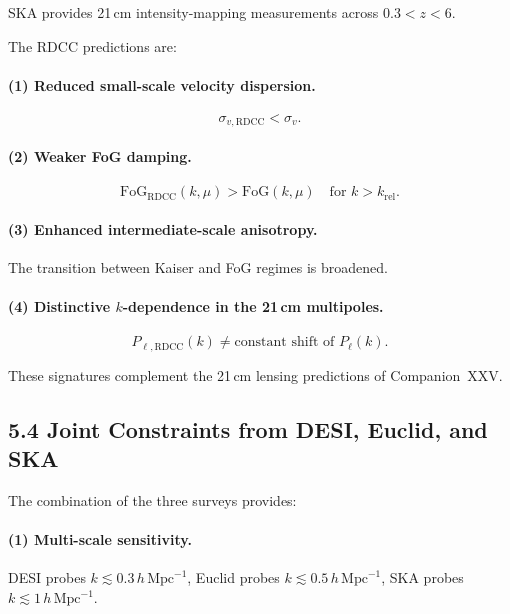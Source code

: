 \documentclass[11pt,a4paper]{article}
\begin{document}
SKA provides 21\,cm intensity-mapping measurements across $0.3 < z < 6$.

The RDCC predictions are:

\paragraph{(1) Reduced small-scale velocity dispersion.}


\[
\sigma_{v,\mathrm{RDCC}} < \sigma_{v}.
\]



\paragraph{(2) Weaker FoG damping.}


\[
\mathrm{FoG}_{\mathrm{RDCC}}(k,\mu)
>
\mathrm{FoG}(k,\mu)
\quad \text{for } k > k_{\mathrm{rel}}.
\]



\paragraph{(3) Enhanced intermediate-scale anisotropy.}
The transition between Kaiser and FoG regimes is broadened.

\paragraph{(4) Distinctive $k$-dependence in the 21\,cm multipoles.}


\[
P_{\ell,\mathrm{RDCC}}(k)
\neq
\text{constant shift of } P_{\ell}(k).
\]



These signatures complement the 21\,cm lensing predictions of Companion~XXV.

\subsection{5.4 Joint Constraints from DESI, Euclid, and SKA}

The combination of the three surveys provides:

\paragraph{(1) Multi-scale sensitivity.}
DESI probes $k \lesssim 0.3\,h\,\mathrm{Mpc}^{-1}$,  
Euclid probes $k \lesssim 0.5\,h\,\mathrm{Mpc}^{-1}$,  
SKA probes $k \lesssim 1\,h\,\mathrm{Mpc}^{-1}$.
\end{document}
